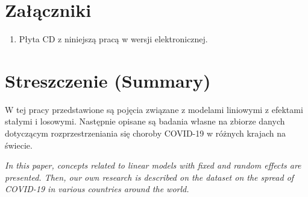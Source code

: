 \documentclass[12pt]{mwbk}
\theoremstyle{plain}
\theoremstyle{definition}
\theoremstyle{remark}
\begin{document}
\listoffigures

\listoftables


\chapter*{Załączniki}
\begin{enumerate}
\item Płyta CD z niniejszą pracą w wersji elektronicznej.
\end{enumerate}




\chapter*{Streszczenie (Summary)}

\bigskip
\bigskip

\begin{center}
  \textbf{\tytul}
\end{center}

W tej pracy przedstawione są pojęcia związane z modelami liniowymi z efektami stałymi i losowymi. Następnie opisane są badania własne na zbiorze danych dotyczącym rozprzestrzeniania się choroby COVID-19 w różnych krajach na świecie.


\bigskip

\begin{center}
  \textbf{\textit{\tytulangielski}}
\end{center}



{\it
In this paper, concepts related to linear models with fixed and random effects are presented. Then, our own research is described on the dataset on the spread of COVID-19 in various countries around the world.
}
\end{document}
